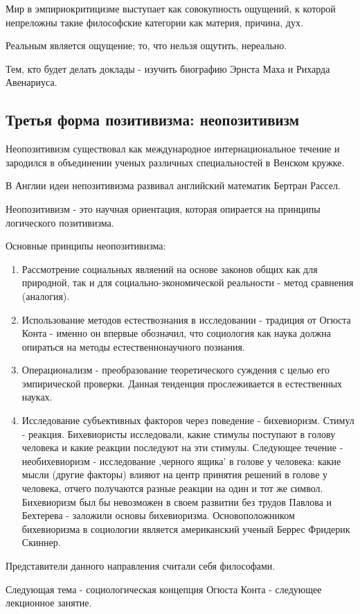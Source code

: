 \documentclass{article}
\begin{document}
Мир в эмпириокритицизме выступает как совокупность ощущений, к которой непреложны такие философские категории как материя, причина, дух.

Реальным является ощущение; то, что нельзя ощутить, нереально.

Тем, кто будет делать доклады - изучить биографию Эрнста Маха и Рихарда Авенариуса.

\subsection{Третья форма позитивизма: неопозитивизм}

Неопозитивизм существовал как международное интернациональное течение и зародился в объединении ученых различных специальностей в Венском кружке.

В Англии идеи непозитивизма развивал английский математик Бертран Рассел.

Неопозитивизм - это научная ориентация, которая опирается на принципы логического позитивизма.

Основные принципы неопозитивизма:

\begin{enumerate}
    \item Рассмотрение социальных являений на основе законов общих как для природной, так и для социально-экономической реальности - метод сравнения (аналогия).
    \item Использование методов естествознания в исследовании - традиция от Огюста Конта - именно он впервые обозначил, что социология как наука должна опираться на методы естественнонаучного познания.
    \item Операционализм - преобразование теоретического суждения с целью его эмпирической проверки. Данная тенденция прослеживается в естественных науках.
    \item Исследование субъективных факторов через поведение - бихевиоризм. Стимул - реакция. Бихевиористы исследовали, какие стимулы поступают в голову человека и какие реакции последуют на эти стимулы. Следующее течение - необихевиоризм - исследование ,черного ящика' в голове у человека: какие мысли (другие факторы) влияют на центр принятия решений в голове у человека, отчего получаются разные реакции на один и тот же символ. Бихевиоризм был бы невозможен в своем развитии без трудов Павлова и Бехтерева - заложили основы бихевиоризма. Основоположником бихевиоризма в социологии является американский ученый Беррес Фридерик Скиннер.
\end{enumerate}

Представители данного направления считали себя философами.

Следующая тема - социологическая концепция Огюста Конта - следующее лекционное занятие.
\end{document}
